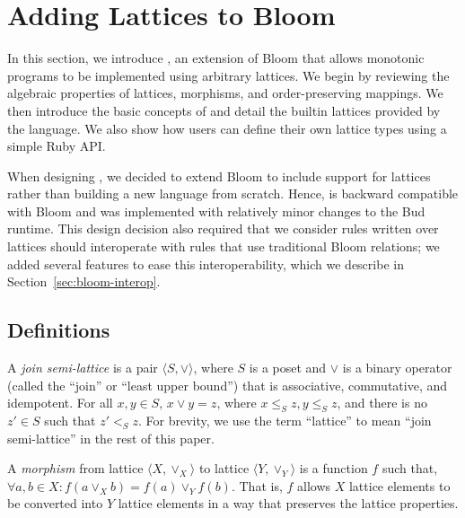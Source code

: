 \section{Adding Lattices to Bloom}
\label{sec:lang}

In this section, we introduce \lang, an extension of Bloom that allows monotonic
programs to be implemented using arbitrary lattices. We begin by reviewing the
algebraic properties of lattices, morphisms, and order-preserving mappings. We
then introduce the basic concepts of \lang and detail the builtin lattices
provided by the language. We also show how users can define their own lattice
types using a simple Ruby API.

When designing \lang, we decided to extend Bloom to include support for
lattices rather than building a new language from scratch. Hence, \lang is
backward compatible with Bloom and was implemented with relatively minor
changes to the Bud runtime. This design decision also required that we consider
rules written over lattices should interoperate with rules that use traditional
Bloom relations; we added several \lang features to ease this interoperability,
which we describe in Section~\ref{sec:bloom-interop}.

\subsection{Definitions}
\label{sec:lattice-defn}
A \emph{join semi-lattice} is a pair $\langle S, \lor \rangle$, where $S$ is a
poset and $\lor$ is a binary operator (called the ``join'' or ``least upper
bound'') that is associative, commutative, and idempotent. For all $x, y \in S$,
$x \lor y = z$, where $x \leq_S z, y \leq_S z$, and there is no $z' \in S$ such
that $z' <_S z$. For brevity, we use the term ``lattice'' to mean ``join
semi-lattice'' in the rest of this paper.

A \emph{morphism} from lattice $\langle X, \lor_X\rangle$ to lattice $\langle Y,
\lor_Y\rangle$ is a function $f$ such that, $\forall a,b \in X: f(a \lor_X b) =
f(a) \lor_Y f(b)$. That is, $f$ allows $X$ lattice elements to be converted into
$Y$ lattice elements in a way that preserves the lattice properties.

